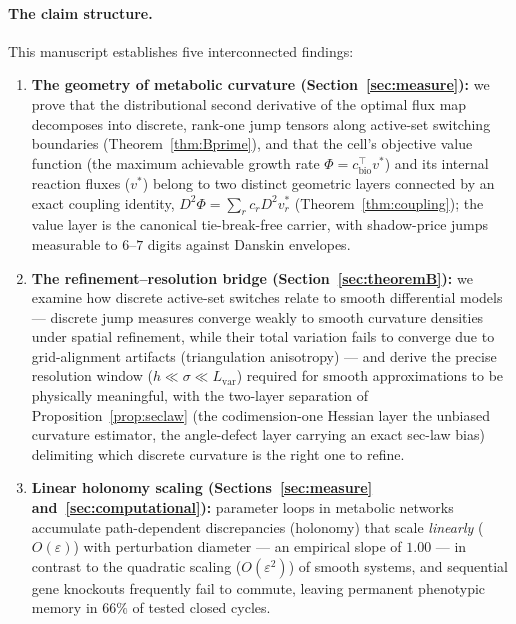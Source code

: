 \documentclass[11pt,a4paper]{article}
\theoremstyle{plain}
\theoremstyle{definition}
\theoremstyle{remark}
\begin{document}
\paragraph{The claim structure.}
This manuscript establishes five interconnected findings:
\begin{enumerate}[label=(\roman*)]
\item \textbf{The geometry of metabolic curvature
      (Section~\ref{sec:measure}):} we prove that the distributional
      second derivative of the optimal flux map decomposes into
      discrete, rank-one jump tensors along active-set switching
      boundaries (Theorem~\ref{thm:Bprime}), and that the cell's
      objective value function (the maximum achievable growth rate
      $\Phi = c_{\mathrm{bio}}^\top v^*$) and its internal reaction
      fluxes ($v^*$) belong to two distinct geometric layers connected
      by an exact coupling identity, $D^2 \Phi = \sum_r c_r D^2
      v^*_r$ (Theorem~\ref{thm:coupling}); the value layer is the
      canonical tie-break-free carrier, with shadow-price jumps
      measurable to $6$--$7$ digits against Danskin envelopes.
\item \textbf{The refinement--resolution bridge
      (Section~\ref{sec:theoremB}):} we examine how discrete
      active-set switches relate to smooth differential models ---
      discrete jump measures converge weakly to smooth curvature
      densities under spatial refinement, while their total variation
      fails to converge due to grid-alignment artifacts (triangulation
      anisotropy) --- and derive the precise resolution window
      ($h \ll \sigma \ll L_{\mathrm{var}}$) required for smooth
      approximations to be physically meaningful, with the two-layer
      separation of Proposition~\ref{prop:seclaw} (the codimension-one
      Hessian layer the unbiased curvature estimator, the
      angle-defect layer carrying an exact sec-law bias) delimiting
      which discrete curvature is the right one to refine.
\item \textbf{Linear holonomy scaling (Sections~\ref{sec:measure}
      and~\ref{sec:computational}):} parameter loops in metabolic
      networks accumulate path-dependent discrepancies (holonomy) that
      scale \emph{linearly} ($O(\varepsilon)$) with perturbation diameter
      --- an empirical slope of $1.00$ --- in contrast to the
      quadratic scaling ($O(\varepsilon^2)$) of smooth systems, and
      sequential gene knockouts frequently fail to commute, leaving
      permanent phenotypic memory in $66\%$ of tested closed cycles.

\end{enumerate}
\end{document}
